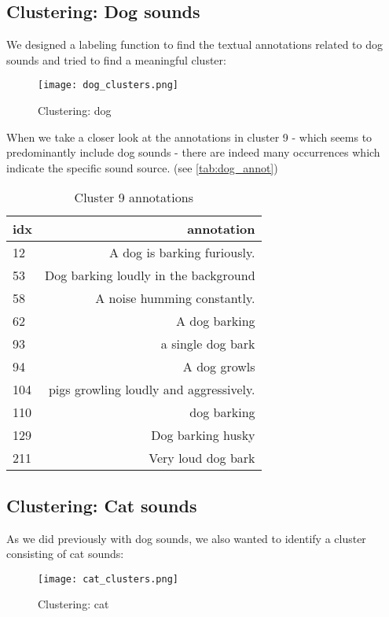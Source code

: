 \documentclass{article}
\begin{document}
\subsection{Clustering: Dog sounds}
We designed a labeling function to find the textual annotations related to dog sounds and tried to find a meaningful cluster:

\begin{figure}[H]
    \centering
    \texttt{[image: dog\_clusters.png]}
    \caption{Clustering: dog}
    \label{fig:dog_clusters}
\end{figure}

When we take a closer look at the annotations in cluster 9 - which seems to predominantly include dog sounds - there are indeed many occurrences which indicate the specific sound source. (see \autoref{tab:dog_annot})

\begin{table}[H]
  \caption{Cluster 9 annotations}
  \label{tab:dog_annot}
  \centering
  \begin{tabular}{lr}
    \toprule
    idx & annotation \\
    \midrule
    12 & A dog is barking furiously.  \\
    53 & Dog barking loudly in the background \\
    58 & A noise humming constantly. \\
    62 & A dog barking \\
    93 & a single dog bark \\
    94 & A dog growls \\
    104 & pigs growling loudly and aggressively. \\
    110 & dog barking \\
    129 & Dog barking husky \\
    211 & Very loud dog bark \\
    \bottomrule
  \end{tabular}
\end{table}

\subsection{Clustering: Cat sounds}
As we did previously with dog sounds, we also wanted to identify a cluster consisting of cat sounds:

\begin{figure}[H]
    \centering
    \texttt{[image: cat\_clusters.png]}
    \caption{Clustering: cat}
    \label{fig:cat_clusters}
\end{figure}
\end{document}
